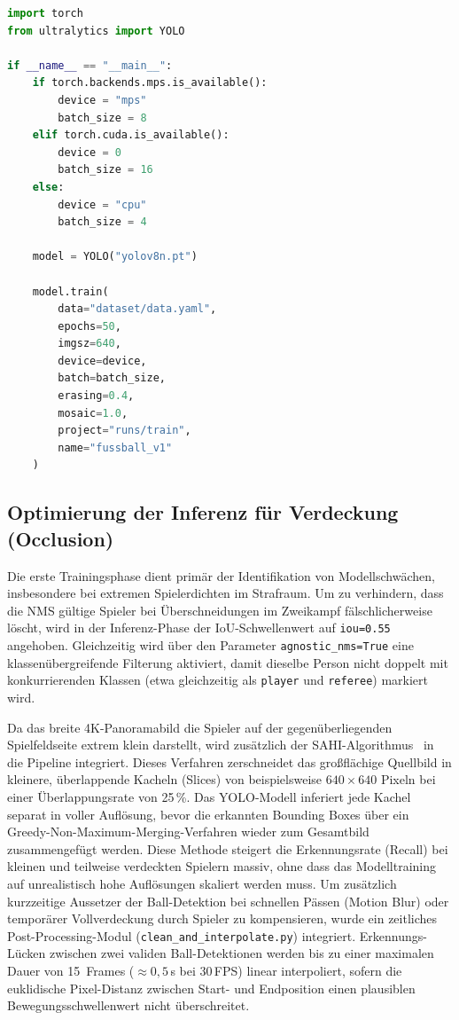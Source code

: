\begin{lstlisting}[language=Python, caption={Plattformübergreifendes Trainings-Skript für das YOLOv8 Fine-Tuning (\texttt{train.py})}, label=code:training]
import torch
from ultralytics import YOLO

if __name__ == "__main__":
    if torch.backends.mps.is_available():
        device = "mps"
        batch_size = 8
    elif torch.cuda.is_available():
        device = 0
        batch_size = 16
    else:
        device = "cpu"
        batch_size = 4

    model = YOLO("yolov8n.pt")

    model.train(
        data="dataset/data.yaml",
        epochs=50,
        imgsz=640,
        device=device,
        batch=batch_size,
        erasing=0.4,
        mosaic=1.0,
        project="runs/train",
        name="fussball_v1"
    )
\end{lstlisting}

\subsection{Optimierung der Inferenz für Verdeckung (Occlusion)}

Die erste Trainingsphase dient primär der Identifikation von 
Modellschwächen, insbesondere bei extremen Spielerdichten im Strafraum.
 Um zu verhindern, dass die \ac{NMS} gültige Spieler bei 
 Überschneidungen im Zweikampf fälschlicherweise löscht, wird in 
 der Inferenz-Phase der \ac{IoU}-Schwellenwert 
 auf \texttt{iou=0.55} angehoben. Gleichzeitig wird über den 
 Parameter \texttt{agnostic\_nms=True} eine klassenübergreifende 
 Filterung aktiviert, damit dieselbe Person nicht doppelt mit 
 konkurrierenden Klassen (etwa gleichzeitig als \texttt{player} 
 und \texttt{referee}) markiert wird.

Da das breite 4K-Panoramabild die Spieler auf der gegenüberliegenden Spielfeldseite extrem klein darstellt, 
wird zusätzlich der \ac{SAHI}-Algorithmus~\cite{akyon2022sahi} in die Pipeline integriert. Dieses 
Verfahren zerschneidet das großflächige Quellbild in kleinere, überlappende Kacheln (Slices) von 
beispielsweise $640 \times 640$ Pixeln bei einer Überlappungsrate von 25\,\%. Das \ac{YOLO}-Modell 
inferiert jede Kachel separat in voller Auflösung, bevor die erkannten Bounding Boxes über ein 
Greedy-Non-Maximum-Merging-Verfahren wieder zum Gesamtbild zusammengefügt werden. Diese Methode 
steigert die Erkennungsrate (Recall) bei kleinen und teilweise verdeckten Spielern massiv, ohne 
dass das Modelltraining auf unrealistisch hohe Auflösungen skaliert werden muss.
Um zusätzlich kurzzeitige Aussetzer der Ball-Detektion bei schnellen Pässen (Motion Blur) oder temporärer 
Vollverdeckung durch Spieler zu kompensieren, wurde ein zeitliches Post-Processing-Modul 
(\texttt{clean\_and\_interpolate.py}) integriert. Erkennungs-Lücken zwischen zwei validen 
Ball-Detektionen werden bis zu einer maximalen Dauer von 15~Frames ($\approx 0{,}5$\,s bei 30\,FPS) 
linear interpoliert, sofern die euklidische Pixel-Distanz zwischen Start- und Endposition einen 
plausiblen Bewegungsschwellenwert nicht überschreitet.


